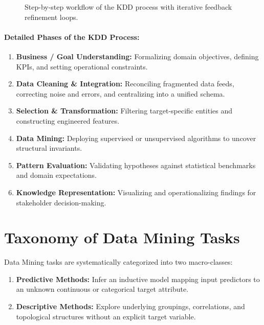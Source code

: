 \begin{figure}[H]
\caption{Step-by-step workflow of the KDD process with iterative feedback refinement loops.}
\label{fig:kdd-process-en}
\end{figure}

\paragraph{Detailed Phases of the KDD Process:}
\begin{enumerate}
    \item \textbf{Business / Goal Understanding:} Formalizing domain objectives, defining KPIs, and setting operational constraints.
    \item \textbf{Data Cleaning \& Integration:} Reconciling fragmented data feeds, correcting noise and errors, and centralizing into a unified schema.
    \item \textbf{Selection \& Transformation:} Filtering target-specific entities and constructing engineered features.
    \item \textbf{Data Mining:} Deploying supervised or unsupervised algorithms to uncover structural invariants.
    \item \textbf{Pattern Evaluation:} Validating hypotheses against statistical benchmarks and domain expectations.
    \item \textbf{Knowledge Representation:} Visualizing and operationalizing findings for stakeholder decision-making.
\end{enumerate}

\FloatBarrier
\section{Taxonomy of Data Mining Tasks}

Data Mining tasks are systematically categorized into two macro-classes:
\begin{enumerate}
    \item \textbf{Predictive Methods:} Infer an inductive model mapping input predictors to an unknown continuous or categorical target attribute.
    \item \textbf{Descriptive Methods:} Explore underlying groupings, correlations, and topological structures without an explicit target variable.
\end{enumerate}


